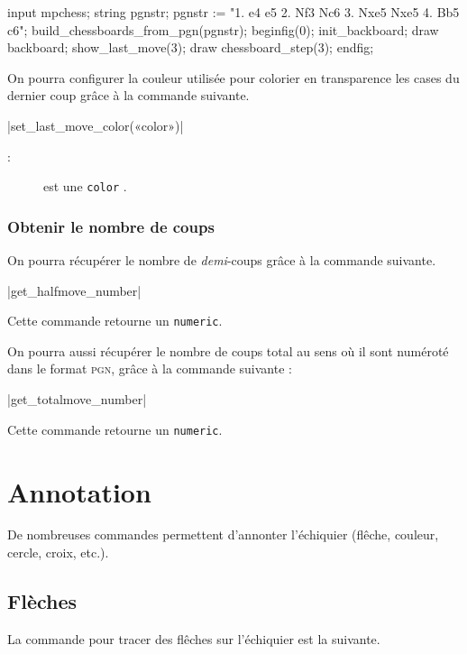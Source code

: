 \documentclass[french]{ltxdoc}
\begin{document}
\begin{ExempleMP}
input mpchess;
string pgnstr;
pgnstr := "1. e4 e5 2. Nf3 Nc6 3. Nxe5 Nxe5 4. Bb5 c6";
build_chessboards_from_pgn(pgnstr);
beginfig(0);
init_backboard;
draw backboard;
show_last_move(3);
draw chessboard_step(3); %
endfig;
\end{ExempleMP}

On pourra configurer la couleur utilisée pour colorier en transparence les cases du dernier coup grâce à la commande suivante.

\commande|set_last_move_color(«color»)|\smallskip
\begin{description}
  \item[:] est une \lstinline+color+ \MP.
\end{description}



\subsubsection{Obtenir le nombre de coups}

On pourra récupérer le nombre de \emph{demi}-coups grâce à la
commande suivante.

\commande|get_halfmove_number|\smallskip

Cette commande retourne un \lstinline+numeric+.

On pourra aussi récupérer le nombre de coups \og{}total\fg{} au sens où il sont numéroté dans le format \textsc{pgn}, grâce à la commande suivante :

\commande|get_totalmove_number|\smallskip

Cette commande retourne un \lstinline+numeric+.

\section{Annotation}

De nombreuses commandes permettent d’annonter l’échiquier (flêche, couleur, cercle, croix, etc.).

\subsection{Flèches}

La commande pour tracer des flêches sur l’échiquier est la suivante.
\end{document}
